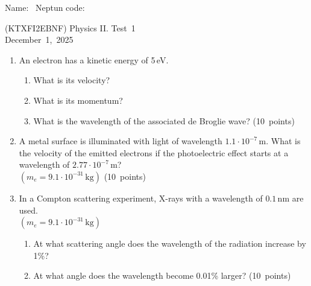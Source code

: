 \documentclass[12pt]{letter}
\begin{document}
Name: \hrulefill \ Neptun code: \hrulefill

\begin{center}
(KTXFI2EBNF) Physics II. Test~1 \\
December~1,~2025 
\end{center}

\bigskip

\begin{enumerate}
\setcounter{enumi}{0} %

\item An electron has a kinetic energy of 5\,eV.
    \begin{enumerate}
        \item What is its velocity?
        \item What is its momentum?
        \item What is the wavelength of the associated de Broglie wave? \hfill (10~points)
    \end{enumerate}


\bigskip
\item A metal surface is illuminated with light of wavelength $1.1 \cdot 10^{-7}\,\text{m}$.  
  What is the velocity of the emitted electrons if the photoelectric effect starts at a wavelength of $2.77 \cdot 10^{-7}\,\text{m}$? \\ $(m_e = 9.1 \cdot 10^{-31}\,\text{kg})$  \hfill (10~points)


\bigskip
\item In a Compton scattering experiment, X-rays with a wavelength of $0.1\,\text{nm}$ are used. \\ $(m_e = 9.1 \cdot 10^{-31}\,\text{kg})$
    \begin{enumerate}
        \item At what scattering angle does the wavelength of the radiation increase by 1\%?
        \item At what angle does the wavelength become 0.01\% larger? \hfill (10~points)
    \end{enumerate}



\end{enumerate}
\end{document}
